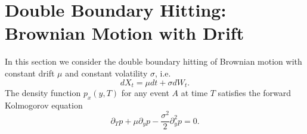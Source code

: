 %






\section{Double Boundary Hitting: Brownian Motion with Drift}
In this section we consider the double boundary hitting of Brownian motion 
with constant drift $\mu$ and constant volatility $\sigma$, i.e. 
\[
	dX_t = \mu dt + \sigma dW_t.
\]
The density function $p_x(y,T)$ for any event $A$ at time $T$ satisfies the
forward Kolmogorov equation
\[
	\partial_T p + \mu \partial_y p - \frac{\sigma^2}{2} \partial_y^2 p = 0.
\]

